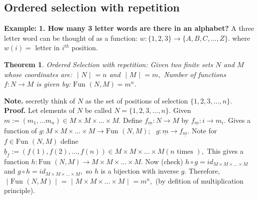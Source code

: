 \documentclass{article}
\newtheorem{theorem}{Theorem}                                       %
\begin{document}
\subsection{Ordered selection with repetition}
\textbf{Example: }
\textbf{1. How many 3 letter words are there in an alphabet?}
\newline
\newline
A three letter word can be thought of as a function: $w:  \{ 1, 2, 3 \} \rightarrow \{ A, B, C, \dots, Z\}.$ where $w(i) = $ letter in $i^{th}$ position.
\newline
\newline
\begin{theorem}
  Ordered Selection with repetition: Given two finite sets $N$ and $M$ whose
  coordinates are: $\text{ | } N \text{ | } = n$ and $\text{ | } M \text{ | } = m,$
  \newline
  Number of functions $f: N \rightarrow M$ is given by: $\text{Fun }(N, M) = m^n$.
\end{theorem}
\textbf{Note. } secretly think of $N$ as the set of positions of selection $\{ 1, 2, 3, \dots, n\}.$
\newline
\newline
\textbf{Proof. } Let elements of $N$ be called $N = \{ 1, 2, 3, \dots, n \}.$
\newline
\newline
Given $m := (m_1, \dots m_n) \in M \times M \times \dots \times M.$
\newline
Define $f_{\underline{m}}: N \rightarrow M$ by $f_{\underline{m}}:i \rightarrow m_i.$
\newline
Gives a function of $g: M \times M \times \dots \times M \rightarrow \text{Fun }(N, M); \text{ } g: \underline{m} \rightarrow f_{\underline{m}}.$
\newline
\newline
Note for $f \in  \text{Fun }(N, M)$ define $\underline{b}_{f} := (f(1), f(2), \dots, f(n)) \in M \times M \times \dots \times M (n \text{ times }),$
\newline
This gives a function $h: \text{Fun }(N, M) \rightarrow M \times M \times \dots \times M.$
\newline
Now (check) $h \circ g = id_{M \times M \times \dots \times M}$ and $g \circ h = id_{M \times M \times \dots \times M},$
\newline
\newline
so $h$ is a bijection with inverse $g$.
\newline
\newline
Therefore, $\text{ | } \text{Fun }(N, M) \text{ | } = \text{ | } M \times M \times \dots \times M \text{ | } = m^n,$ (by defition of multiplication principle).
\newpage
\end{document}
